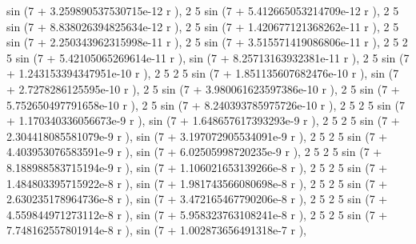 \documentclass[a4paper,10pt]{article}
\begin{document}
\begin{eulernotebook}
\begin{eulercomment}
\begin{eulercomment}
\begin{eulercomment}
\begin{eulercomment}
\begin{eulercomment}
\begin{eulercomment}
\begin{eulercomment}
\begin{eulercomment}
\begin{eulercomment}
\begin{eulercomment}
\begin{eulercomment}
\begin{eulercomment}
\begin{eulercomment}
\begin{eulercomment}
\begin{eulercomment}
\begin{eulercomment}
\begin{eulercomment}
\begin{eulercomment}
\begin{eulercomment}
\begin{eulercomment}
\begin{eulercomment}
\begin{eulercomment}
\begin{eulercomment}
\begin{eulercomment}
\begin{eulercomment}
\begin{eulercomment}
\begin{eulercomment}
\begin{eulercomment}
\begin{euleroutput}
  sin (7 + 3.259890537530715e-12 r ), 
     2                            5
  sin (7 + 5.412665053214709e-12 r ), 
     2                            5
  sin (7 + 8.838026394825634e-12 r ), 
     2                            5
  sin (7 + 1.420677121368262e-11 r ), 
     2                            5
  sin (7 + 2.250343962315998e-11 r ), 
     2                            5
  sin (7 + 3.515571419086806e-11 r ), 
     2                           5      2                           5
  sin (7 + 5.42105065269614e-11 r ), sin (7 + 8.25713163932381e-11 r ), 
     2                            5
  sin (7 + 1.243153394347951e-10 r ), 
     2                            5      2                          5
  sin (7 + 1.851135607682476e-10 r ), sin (7 + 2.7278286125595e-10 r ), 
     2                            5
  sin (7 + 3.980061623597386e-10 r ), 
     2                            5
  sin (7 + 5.752650497791658e-10 r ), 
     2                            5
  sin (7 + 8.240393785975726e-10 r ), 
     2                           5      2                           5
  sin (7 + 1.170340336056673e-9 r ), sin (7 + 1.648657617393293e-9 r ), 
     2                           5      2                           5
  sin (7 + 2.304418085581079e-9 r ), sin (7 + 3.197072905534091e-9 r ), 
     2                           5      2                          5
  sin (7 + 4.403953076583591e-9 r ), sin (7 + 6.02505998720235e-9 r ), 
     2                           5      2                           5
  sin (7 + 8.188988583715194e-9 r ), sin (7 + 1.106021653139266e-8 r ), 
     2                           5      2                           5
  sin (7 + 1.484803395715922e-8 r ), sin (7 + 1.981743566080698e-8 r ), 
     2                           5      2                           5
  sin (7 + 2.630235178964736e-8 r ), sin (7 + 3.472165467790206e-8 r ), 
     2                           5      2                           5
  sin (7 + 4.559844971273112e-8 r ), sin (7 + 5.958323763108241e-8 r ), 
     2                           5      2                           5
  sin (7 + 7.748162557801914e-8 r ), sin (7 + 1.002873656491318e-7 r ), 

\end{euleroutput}
\end{eulercomment}
\end{eulercomment}
\end{eulercomment}
\end{eulercomment}
\end{eulercomment}
\end{eulercomment}
\end{eulercomment}
\end{eulercomment}
\end{eulercomment}
\end{eulercomment}
\end{eulercomment}
\end{eulercomment}
\end{eulercomment}
\end{eulercomment}
\end{eulercomment}
\end{eulercomment}
\end{eulercomment}
\end{eulercomment}
\end{eulercomment}
\end{eulercomment}
\end{eulercomment}
\end{eulercomment}
\end{eulercomment}
\end{eulercomment}
\end{eulercomment}
\end{eulercomment}
\end{eulercomment}
\end{eulercomment}
\end{eulernotebook}
\end{document}

